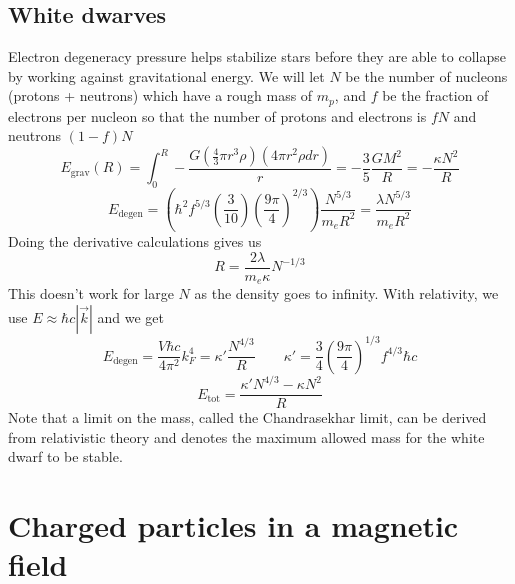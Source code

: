 \documentclass{article}
\begin{document}
\subsection{White dwarves}
Electron degeneracy pressure helps stabilize stars before they are able to collapse by working against gravitational energy. We will let $N$ be the number of nucleons (protons + neutrons) which have a rough mass of $m_p$, and $f$ be the fraction of electrons per nucleon so that the number of protons and electrons is $fN$ and neutrons $(1-f)N$
$$E_{\text{grav}}(R) = \int_0^R -\frac{G(\frac{4}{3}\pi r^3\rho)(4\pi r^2 \rho dr)}{r}= -\frac{3}{5} \frac{GM^2}{R}=-\frac{\kappa N^2}{R}$$  
$$E_{\text{degen}} =\left(\hbar^2 f^{5/3} \left(\frac{3}{10}\right)\left(\frac{9\pi}{4}\right)^{2/3}\right)\frac{N^{5/3}}{m_e R^2}=\frac{\lambda N^{5/3}}{m_e R^2}$$
Doing the derivative calculations gives us
$$R=\frac{2\lambda}{m_e \kappa}N^{-1/3} $$
This doesn't work for large $N$ as the density goes to infinity. With relativity, we use $E\approx \hbar c|\vec k|$ and we get
$$E_{\text{degen}}=\frac{V\hbar c}{4\pi^2} k_F^4=\kappa'\frac{N^{4/3}}{R}\qquad \kappa'=\frac{3}{4}\left(\frac{9\pi}{4}\right)^{1/3}f^{4/3}\hbar c$$
$$E_{\text{tot}}=\frac{\kappa'N^{4/3}-\kappa N^2}{R}$$
Note that a limit on the mass, called the Chandrasekhar limit, can be derived from relativistic theory and denotes the maximum allowed mass for the white dwarf to be stable.
\section{Charged particles in a magnetic field}
\end{document}

